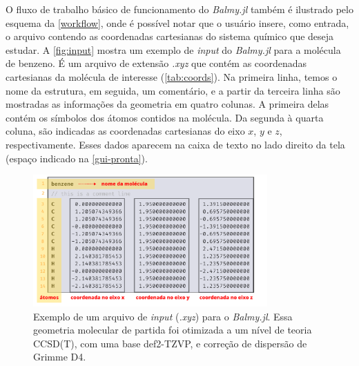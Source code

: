 O fluxo de trabalho básico de funcionamento do \textit{Balmy.jl} também é ilustrado pelo esquema da \autoref{workflow}, onde é possível notar que o usuário insere, como entrada, o arquivo contendo as coordenadas cartesianas do sistema químico que deseja estudar. A \autoref{fig:input} mostra um exemplo de \textit{input} do \textit{Balmy.jl} para a molécula de benzeno. É um arquivo de extensão \textit{.xyz} que contém as coordenadas cartesianas da molécula de interesse (\autoref{tab:coords}). Na primeira linha, temos o nome da estrutura, em seguida, um comentário, e a partir da terceira linha são mostradas as informações da geometria em quatro colunas. A primeira delas contém os símbolos dos átomos contidos na molécula. Da segunda à quarta coluna, são indicadas as coordenadas cartesianas do eixo $x$, $y$ e $z$, respectivamente. Esses dados aparecem na caixa de texto no lado direito da tela (espaço indicado na \autoref{gui-pronta}).

\begin{figure}[htb]
	\caption{\label{fig:input} Exemplo de um arquivo de \textit{input} (\textit{.xyz}) para o \textit{Balmy.jl}. Essa geometria molecular de partida foi otimizada a um nível de teoria CCSD(T), com uma base def2-TZVP, e correção de dispersão de Grimme D4.}
	\begin{center}
		\includegraphics[width=0.8\textwidth]{images/fig2(4).png}
	\end{center}
\end{figure}


